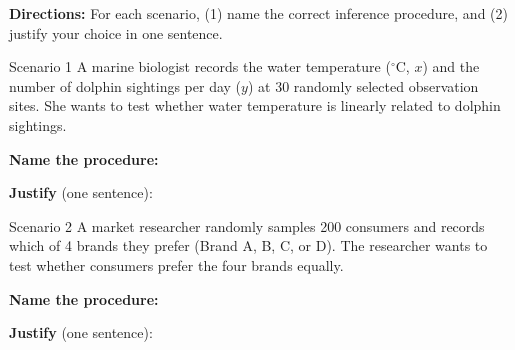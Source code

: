 \documentclass[10pt]{article}
\begin{document}
\namedateperiod

\vspace{0.1in}

\textbf{Directions:} For each scenario, (1) name the correct inference procedure, and
(2) justify your choice in one sentence.

\begin{notesbox}{Scenario 1}
A marine biologist records the water temperature ($^\circ$C, $x$) and the number of dolphin
sightings per day ($y$) at 30 randomly selected observation sites. She wants to test whether
water temperature is linearly related to dolphin sightings.

\vspace{0.1in}
\textbf{Name the procedure:} 

\vspace{0.1in}
\textbf{Justify} (one sentence):
\end{notesbox}

\begin{notesbox}{Scenario 2}
A market researcher randomly samples 200 consumers and records which of 4 brands they
prefer (Brand A, B, C, or D). The researcher wants to test whether consumers prefer the
four brands equally.

\vspace{0.1in}
\textbf{Name the procedure:} 

\vspace{0.1in}
\textbf{Justify} (one sentence):
\end{notesbox}
\end{document}
